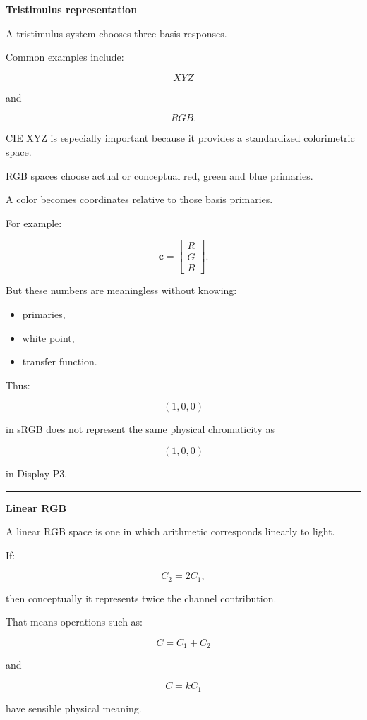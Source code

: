 \textbf{Tristimulus representation}

A tristimulus system chooses three basis responses.

Common examples include:

\[
XYZ
\]

and

\[
RGB.
\]

CIE XYZ is especially important because it provides a standardized colorimetric space.

RGB spaces choose actual or conceptual red, green and blue primaries.

A color becomes coordinates relative to those basis primaries.

For example:

\[
\mathbf c=
\begin{bmatrix}
R\\G\\B
\end{bmatrix}.
\]

But these numbers are meaningless without knowing:

\begin{itemize}
\tightlist
\item
  primaries,
\item
  white point,
\item
  transfer function.
\end{itemize}

Thus:

\[
(1,0,0)
\]

in sRGB does not represent the same physical chromaticity as

\[
(1,0,0)
\]

in Display P3.

\begin{center}\rule{0.5\linewidth}{0.5pt}\end{center}

\textbf{Linear RGB}

A linear RGB space is one in which arithmetic corresponds linearly to light.

If:

\[
C_2=2C_1,
\]

then conceptually it represents twice the channel contribution.

That means operations such as:

\[
C=C_1+C_2
\]

and

\[
C=kC_1
\]

have sensible physical meaning.

